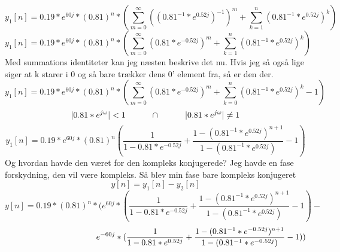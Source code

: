 \begin{Opgaver}
\begin{kapitel}
\begin{Opgave}
\begin{Udklip}
\begin{UnderOpgave}[\text{Determine analytically the response $y[n]$ to the input $x[n] = 2 cos(0.52n + 60°)$.}]
                    \[y_1[n] = 0.19 * e^{60j} * (0.81)^n * (\sum_{m = 0}^{\infty}{((0.81^{-1}*e^{0.52j})^{-1})^{m}} + \sum_{k = 1}^{n}{(0.81^{-1}*e^{0.52j})^k})\]
                    \[y_1[n] = 0.19 * e^{60j} * (0.81)^n * (\sum_{m = 0}^{\infty}{(0.81*e^{-0.52j})^{m}} + \sum_{k = 1}^{n}{(0.81^{-1}*e^{0.52j})^k})\]
                    Med summations identiteter kan jeg næsten beskrive det nu. Hvis jeg så også lige siger at k starer i 0 og så bare trækker dens 0' element fra, så er den der. 
                    \[y_1[n] = 0.19 * e^{60j} * (0.81)^n * (\sum_{m = 0}^{\infty}{(0.81*e^{-0.52j})^{m}} + \sum_{k = 0}^{n}{(0.81^{-1}*e^{0.52j})^k} - 1)\]
                    \[|0.81 * e^{j\omega}| < 1 \tab{2} \cap \tab{2} |0.81 * e^{j\omega}|\neq 1\] 
                    \[y_1[n] = 0.19 * e^{60j} * (0.81)^n(\frac{1}{1 - 0.81*e^{-0.52j}} + \frac{1 - (0.81^{-1} * e^{0.52j})^{n + 1}}{1 - (0.81^{-1} * e^{0.52j})} - 1)\]
                    Og hvordan havde den været for den kompleks konjugerede? Jeg havde en fase forskydning, den vil være kompleks. Så blev min fase bare kompleks konjugeret
                    \[y[n] = y_1[n] - y_2[n]\]
                    \[y[n] = 0.19 * (0.81)^n * (e^{60j} * (\frac{1}{1 - 0.81*e^{-0.52j}} + \frac{1 - (0.81^{-1} * e^{0.52j})^{n + 1}}{1 - (0.81^{-1} * e^{0.52j})} - 1) -\]
                    \[\tab{10} e^{-60j} * (\frac{1}{1 - 0.81*e^{0.52j}} + \frac{1 - (0.81^{-1} * e^{-0.52j})^{n + 1}}{1 - (0.81^{-1} * e^{-0.52j})} - 1))\]
                \end{UnderOpgave}\setcounter{alfabetTabular}{2} 
            \end{Udklip}


\end{Opgave}
\end{kapitel}
\end{Opgaver}
